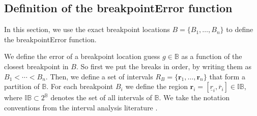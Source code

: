 \documentclass{jsfds} %
\renewcommand{\r}{ \mathbf{ r} }
\newcommand{\rileft}[1][i]{\underline r_{#1}}
\newcommand{\riright}[1][i]{\overline r_{#1}}
\begin{document}


\newpage

\subsection{Definition of the breakpointError function}
\label{sec:breakpoint_error}

In this section, we use the exact breakpoint locations $B=\{B_1,
\dots, B_n\}$ to define the breakpointError function.

We define the error of a breakpoint location guess $g\in\mathbb
B$ as a function of the closest breakpoint in $B$. So
first we put the breaks in order, by writing them as $B_1<\cdots<
B_n$. Then, we define a set of intervals
$R_B=\{\r_1,\dots,\r_n\}$ that form a partition of $\mathbb B$. For each
breakpoint $B_i$ we define the region
${\r}_i=[\rileft,\riright]\in\mathbb I \mathbb B$, where $\mathbb
I\mathbb B\subset 2^{\mathbb B}$ denotes the set of all intervals of
$\mathbb B$. We take the notation conventions from the interval
analysis literature \citep{intervals}.
\end{document}
